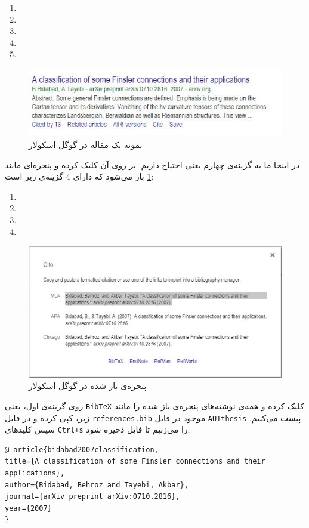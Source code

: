 \begin{enumerate}
\item {}

\item {}

\item {}

\item {}

\item {}
\end{enumerate}
\begin{figure}[!h]
\includegraphics[height=3cm]{bidabad}
\caption{نمونه یک مقاله در گوگل اسکولار}
\end{figure}
در اینجا ما به گزینه‌ی چهارم یعنی
احتیاج داریم. بر روی آن کلیک کرده و پنجره‌ای مانند
\cref{fig.2}
باز می‌شود که دارای $4$ گزینه‌ی زیر است:
\begin{enumerate}
\item {}

\item {}

\item {}

\item {}
\end{enumerate}
\begin{figure}
\centering\includegraphics[scale=.6]{bibref}
\caption{پنجره‌ی باز شده در گوگل اسکولار}\label{fig.2}
\end{figure}
روی گزینه‌ی اول، یعنی
\verb;BibTeX;
کلیک کرده و همه‌ی نوشته‌های پنجره‌ی باز شده را مانند زیر، کپی کرده و در فایل
\verb;references.bib;
موجود در فایل
\verb;AUTthesis;
پیست می‌کنیم. سپس کلیدهای
\verb;Ctrl+s;
را می‌زنیم تا فایل ذخیره شود.\\
\begin{latin}
	\normalsize
\begin{verbatim}
@ article{bidabad2007classification,
title={A classification of some Finsler connections and their applications},
author={Bidabad, Behroz and Tayebi, Akbar},
journal={arXiv preprint arXiv:0710.2816},
year={2007}
}
\end{verbatim}
\end{latin}
